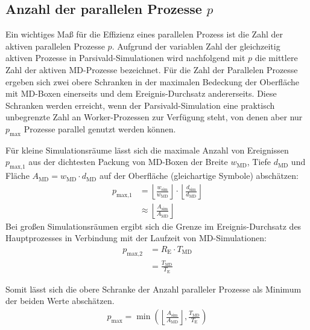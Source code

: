 \subsection{Anzahl der parallelen Prozesse $p$}

Ein wichtiges Maß für die Effizienz eines parallelen Prozess ist die Zahl der aktiven parallelen Prozesse $p$.
Aufgrund der variablen Zahl der gleichzeitig aktiven Prozesse in Parsivald-Simulationen wird nachfolgend mit $p$ die mittlere Zahl der aktiven MD-Prozesse bezeichnet.
Für die Zahl der Parallelen Prozesse ergeben sich zwei obere Schranken in der maximalen Bedeckung der Oberfläche mit MD-Boxen einerseits und dem Ereignis-Durchsatz andererseits.
Diese Schranken werden erreicht, wenn der Parsivald-Simulation eine praktisch unbegrenzte Zahl an Worker-Prozessen zur Verfügung steht, von denen aber nur $p_\text{max}$ Prozesse parallel genutzt werden können.

Für kleine Simulationsräume lässt sich die maximale Anzahl von Ereignissen $p_\text{max,1}$ aus der dichtesten Packung von MD-Boxen der Breite $w_\text{MD}$, Tiefe $d_\text{MD}$ und Fläche $A_\text{MD} = w_\text{MD} \cdot d_\text{MD}$ auf der Oberfläche (gleichartige Symbole) abschätzen:
\begin{align}
  p_\text{max,1} & = \left\lfloor\frac{w_\text{sim}}{w_\text{MD}}\right\rfloor \cdot \left\lfloor\frac{d_\text{sim}}{d_\text{MD}}\right\rfloor \\
  & \approx \left\lfloor\frac{A_\text{sim}}{A_\text{MD}}\right\rfloor
\end{align}
Bei großen Simulationsräumen ergibt sich die Grenze im Ereignis-Durchsatz des Hauptprozesses in Verbindung mit der Laufzeit von MD-Simulationen:
\begin{align}
  p_\text{max,2} & = R_\text{E} \cdot T_\text{MD} \\
                 & = \frac{T_\text{MD}}{T_\text{E}}
\end{align}

Somit lässt sich die obere Schranke der Anzahl paralleler Prozesse als Minimum der beiden Werte abschätzen.
\begin{align}
  p_\text{max} = \min\left(\left\lfloor\frac{A_\text{sim}}{A_\text{MD}}\right\rfloor, \frac{T_\text{MD}}{T_\text{E}}\right)
\end{align}

